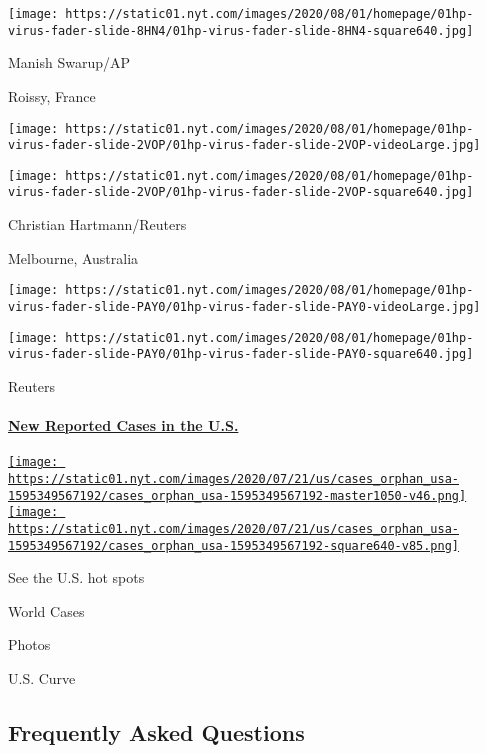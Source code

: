 \texttt{[image: https://static01.nyt.com/images/2020/08/01/homepage/01hp-virus-fader-slide-8HN4/01hp-virus-fader-slide-8HN4-square640.jpg]}

 Manish Swarup/AP

Roissy, France

\texttt{[image: https://static01.nyt.com/images/2020/08/01/homepage/01hp-virus-fader-slide-2VOP/01hp-virus-fader-slide-2VOP-videoLarge.jpg]}

\texttt{[image: https://static01.nyt.com/images/2020/08/01/homepage/01hp-virus-fader-slide-2VOP/01hp-virus-fader-slide-2VOP-square640.jpg]}

 Christian Hartmann/Reuters

Melbourne, Australia

\texttt{[image: https://static01.nyt.com/images/2020/08/01/homepage/01hp-virus-fader-slide-PAY0/01hp-virus-fader-slide-PAY0-videoLarge.jpg]}

\texttt{[image: https://static01.nyt.com/images/2020/08/01/homepage/01hp-virus-fader-slide-PAY0/01hp-virus-fader-slide-PAY0-square640.jpg]}

 Reuters

\hypertarget{new-reported-cases-in-the-us}{%
\paragraph{\texorpdfstring{\href{https://www.nytimes.com/interactive/2020/us/coronavirus-us-cases.html}{New
Reported Cases in the
U.S.}}{New Reported Cases in the U.S.}}\label{new-reported-cases-in-the-us}}

\href{https://www.nytimes.com/interactive/2020/us/coronavirus-us-cases.html}{\texttt{[image: https://static01.nyt.com/images/2020/07/21/us/cases\_orphan\_usa-1595349567192/cases\_orphan\_usa-1595349567192-master1050-v46.png]}
\texttt{[image: https://static01.nyt.com/images/2020/07/21/us/cases\_orphan\_usa-1595349567192/cases\_orphan\_usa-1595349567192-square640-v85.png]}}

See the U.S. hot spots

World Cases

Photos

U.S. Curve

\hypertarget{frequently-asked-questions}{%
\subsection{Frequently Asked
Questions}\label{frequently-asked-questions}}

